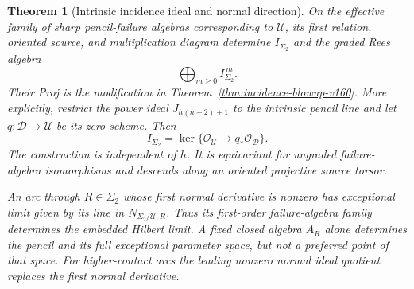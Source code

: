 \documentclass[11pt,reqno]{amsart}
\numberwithin{equation}{section}
\newtheorem{theorem}{Theorem}[section]
\theoremstyle{definition}\newtheorem{definition}[theorem]{Definition}
\theoremstyle{remark}\newtheorem{remark}[theorem]{Remark}
\newcommand{\OO}{\mathcal O}\newcommand{\II}{\mathcal I}
\begin{document}
\begin{theorem}[Intrinsic incidence ideal and normal direction]
\label{thm:failure-incidence-v160}
On the effective family of sharp pencil-failure algebras corresponding
to $\mathcal U$, its first relation, oriented source, and multiplication
diagram determine $I_{\Sigma_2}$ and the graded Rees algebra
\begin{equation}\label{eq:failure-rees-v160}
                \bigoplus_{m\geq0}I_{\Sigma_2}^{\,m}.
\end{equation}
Their Proj is the modification in
Theorem~\ref{thm:incidence-blowup-v160}. More explicitly, restrict
the power ideal $J_{h(n-2)+1}$ to the intrinsic pencil line and let
$q:\mathcal D\to\mathcal U$ be its zero scheme. Then
\begin{equation}\label{eq:failure-incidence-ideal-v160}
 I_{\Sigma_2}=\ker\{\OO_{\mathcal U}\longrightarrow q_*\OO_{\mathcal D}\}.
\end{equation}
The construction is independent of $h$. It is equivariant for ungraded
failure-algebra isomorphisms and descends along an oriented projective
source torsor.

An arc through $R\in\Sigma_2$ whose first normal derivative is nonzero
has exceptional limit given by its line in
$N_{\Sigma_2/\mathcal U,R}$. Thus its first-order failure-algebra
family determines the embedded Hilbert limit. A fixed closed algebra
$A_R$ alone determines the pencil and its full exceptional parameter
space, but not a preferred point of that space. For higher-contact
arcs the leading nonzero normal ideal quotient replaces the first
normal derivative.
\end{theorem}
\end{document}
